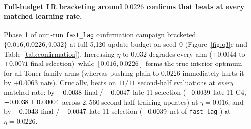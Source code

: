 \paragraph{Full-budget LR bracketing around $0.0226$ confirms that  beats  at every matched learning rate.}
Phase~1 of our \confTotalRuns{}-run \texttt{fast\_lag} confirmation campaign
bracketed $\{0.016, 0.0226, 0.032\}$ at full 5{,}120-update budget on seed~0
(Figure~\ref{fig:q3}c and Table~\ref{tab:confirmation}). Increasing $\eta$ to
$0.032$ degrades every arm ($+0.0044$ to $+0.0071$ final selection), while
$[0.016, 0.0226]$ forms the true interior optimum for all Toner-family arms
(whereas pushing plain  to $0.0226$ immediately hurts it by
$+0.0063$ nats). Crucially,  beats  on $11/11$
second-half evaluations at \emph{every} matched rate: by
$-0.0038{}$ final / $-0.0047{}$
late-11 selection ($-0.0039{}$ late-11 C4,
$-0.0038{} \pm 0.00004{}$ across
$2{,}560$ second-half training updates) at $\eta = 0.016$, and by
$-0.0043{}$ final / $-0.0047{}$
late-11 selection ($-0.0039{}$ net of \texttt{fast\_lag}
) at $\eta = 0.0226$.

